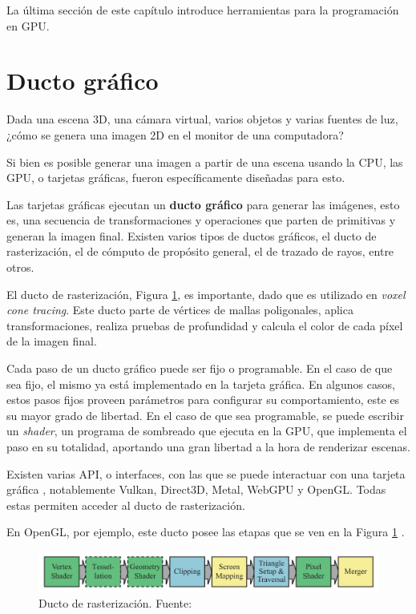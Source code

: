 La última sección de este capítulo introduce herramientas para la programación en GPU.

\section{Ducto gráfico}\label{sec:graphics-pipeline}

Dada una escena 3D, una cámara virtual, varios objetos y varias fuentes de luz, ¿cómo se genera una imagen 2D en el monitor de una computadora?

Si bien es posible generar una imagen a partir de una escena usando la CPU, las GPU, o tarjetas gráficas, fueron específicamente diseñadas para esto.

Las tarjetas gráficas ejecutan un \textbf{ducto gráfico} para generar las imágenes, esto es, una secuencia de transformaciones y operaciones que parten de primitivas y generan la imagen final.
Existen varios tipos de ductos gráficos, el ducto de rasterización, el de cómputo de propósito general, el de trazado de rayos, entre otros.

El ducto de rasterización, Figura \ref{fig:raster-pipeline}, es importante, dado que es utilizado en \textit{voxel cone tracing}.
Este ducto parte de vértices de mallas poligonales, aplica transformaciones, realiza pruebas de profundidad y calcula el color de cada píxel de la imagen final.

Cada paso de un ducto gráfico puede ser fijo o programable.
En el caso de que sea fijo, el mismo ya está implementado en la tarjeta gráfica.
En algunos casos, estos pasos fijos proveen parámetros para configurar su comportamiento, este es su mayor grado de libertad.
En el caso de que sea programable, se puede escribir un \textit{shader}, un programa de sombreado que ejecuta en la GPU, que implementa el paso en su totalidad, aportando una gran libertad a la hora de renderizar escenas.

Existen varias API, o interfaces, con las que se puede interactuar con una tarjeta gráfica \cite{comparison-graphics-apis}, notablemente Vulkan, Direct3D, Metal, WebGPU y OpenGL.
Todas estas permiten acceder al ducto de rasterización.

En OpenGL, por ejemplo, este ducto posee las etapas que se ven en la Figura \ref{fig:raster-pipeline} \cite{rtr}.

\begin{figure}[h!]
    \centering
    \includegraphics[width=\textwidth]{raster-pipeline.png}
    \caption{Ducto de rasterización. Fuente: \cite{rtr}}
    \label{fig:raster-pipeline}
\end{figure}

